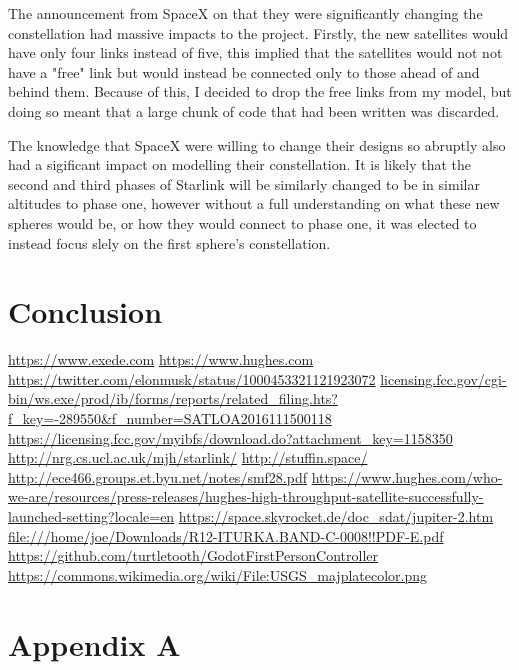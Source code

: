 \documentclass[12pt]{article}
\begin{document}
The announcement from SpaceX on that they were significantly changing the constellation had massive impacts to the project. Firstly, the new satellites would have only four links instead of five, this implied that the satellites would not not have a "free" link but would instead be connected only to those ahead of and behind them. Because of this, I decided to drop the free links from my model, but doing so meant that a large chunk of code that had been written was discarded.

The knowledge that SpaceX were willing to change their designs so abruptly also had a sigificant impact on modelling their constellation. It is likely that the second and third phases of Starlink will be similarly changed to be in similar altitudes to phase one, however without a full understanding on what these new spheres would be, or how they would connect to phase one, it was elected to instead focus slely on the first sphere's constellation. %

\section{Conclusion}


\begin{thebibliography}{99}
	 \url{https://www.exede.com}
	 \url{https://www.hughes.com}
	 \url{https://twitter.com/elonmusk/status/1000453321121923072}
	 \url{licensing.fcc.gov/cgi-bin/ws.exe/prod/ib/forms/reports/related_filing.hts?f_key=-289550&f_number=SATLOA2016111500118}
	 \url{https://licensing.fcc.gov/myibfs/download.do?attachment_key=1158350}
	 \url{http://nrg.cs.ucl.ac.uk/mjh/starlink/}
	 \url{http://stuffin.space/}
	 \url{http://ece466.groups.et.byu.net/notes/smf28.pdf}
	 \url{https://www.hughes.com/who-we-are/resources/press-releases/hughes-high-throughput-satellite-successfully-launched-setting?locale=en}
	 \url{https://space.skyrocket.de/doc_sdat/jupiter-2.htm}
	 \url{file:///home/joe/Downloads/R12-ITURKA.BAND-C-0008!!PDF-E.pdf}
	 \url{https://github.com/turtletooth/GodotFirstPersonController}
	 \url{https://commons.wikimedia.org/wiki/File:USGS_majplatecolor.png}
\end{thebibliography}
\appendix

\section{Appendix A}

\printindex

\end{document}
